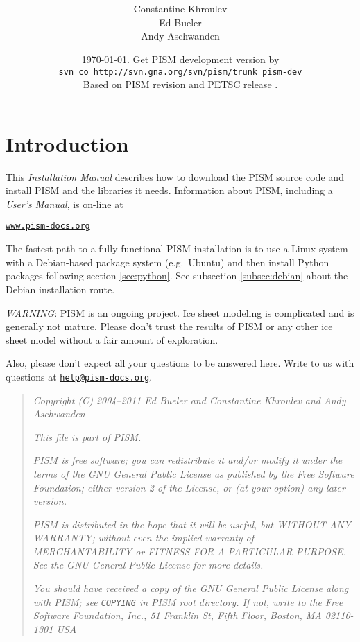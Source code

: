 \documentclass[11pt,final]{amsart}
\title[PISM Installation Manual]{\protect{\Large \emph{PISM}, a Parallel Ice
    Sheet Model:\normalsize} \\ \protect{\Large \bigskip \bigskip Installation
    Manual\normalsize}}
\author[]{Constantine Khroulev \\ Ed Bueler \\ Andy Aschwanden}
\date{\today.  Get PISM development version by \\
\phantom{foobar} \qquad\texttt{svn co http://svn.gna.org/svn/pism/trunk pism-dev} \\
Based on PISM revision \PISMREV\quad and PETSC release \PETSCREL.}
\renewcommand{\t}[1]{\texttt{#1}}
\begin{document}
\maketitle
\thispagestyle{empty}

\vspace{1.5in}
\setcounter{tocdepth}{2}
\tableofcontents



\newpage
\section*{Introduction}

\large
This \emph{Installation Manual} describes how to download the PISM source code and install PISM and the libraries it needs.  Information about PISM, including a \emph{User's Manual}, is on-line at
\bigskip
\begin{center}
  \href{http://www.pism-docs.org}{\t{www.pism-docs.org}}
\end{center}
\bigskip
\noindent The fastest path to a fully functional PISM installation is to use a Linux system with a Debian-based package system (e.g.~Ubuntu) and then install Python packages following section \ref{sec:python}.  See subsection \ref{subsec:debian} about the Debian installation route.
\vfill

\large
\begin{center}
\parbox{5.5in}{ \emph{WARNING}:  PISM is an ongoing project.  Ice sheet modeling is complicated and is generally not mature.  Please don't trust the results of PISM or any other ice sheet model without a fair amount of exploration.

\bigskip
Also, please don't expect all your questions to be answered here.  Write to us with questions at \href{mailto:help@pism-docs.org}{\texttt{help@pism-docs.org}}.}
\normalsize
\end{center}
\normalsize
\vfill

\begin{quote}
\textsl{Copyright (C) 2004--2011 Ed Bueler and Constantine Khroulev and Andy Aschwanden}
\medskip

\noindent \textsl{This file is part of PISM.}
\medskip

\noindent \textsl{PISM is free software; you can redistribute it and/or modify it under the terms of the GNU General Public
  License as published by the Free Software Foundation; either version 2 of the License, or (at your option) any later version.}
\medskip

\noindent \textsl{PISM is distributed in the hope that it will be useful, but WITHOUT ANY WARRANTY; without even the implied
  warranty of MERCHANTABILITY or FITNESS FOR A PARTICULAR PURPOSE. See the GNU General Public License for more details.} \medskip

\noindent \textsl{You should have received a copy of the GNU General Public License along
  with PISM; see \emph{\texttt{COPYING}} in PISM root directory. If not, write to the Free Software Foundation, Inc., 51 Franklin
  St, Fifth Floor, Boston, MA 02110-1301 USA}
\end{quote}
\end{document}

